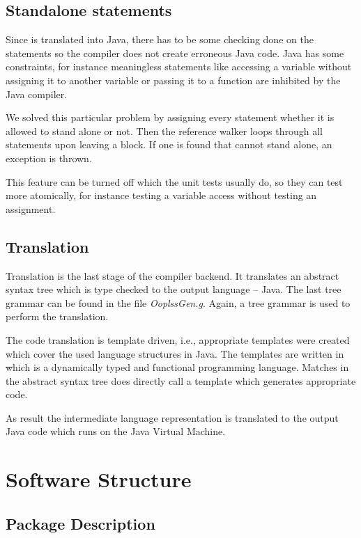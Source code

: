 \subsection{Standalone statements}
Since \ooplss is translated into Java, there has to be some checking
done on the statements so the compiler does not create erroneous Java
code. Java has some constraints, for instance meaningless statements
like accessing a variable without assigning it to another variable
or passing it to a function are inhibited by the Java compiler.

We solved this particular problem by assigning every statement whether
it is allowed to stand alone or not. Then the reference walker loops
through all statements upon leaving a block. If one is found that cannot
stand alone, an exception is thrown.

This feature can be turned off which the unit tests usually do, so
they can test more atomically, for instance testing a variable
access without testing an assignment.

\subsection{Translation}
Translation is the last stage of the compiler backend. It
translates an abstract syntax tree which is type checked to the
output language -- Java. The last tree grammar can be found in the
file \emph{OoplssGen.g}. Again, a tree grammar is used to perform the
translation.

The code translation is template driven, i.e., appropriate templates
were created which cover the used language structures in Java. The
templates are written in \st which is a dynamically typed and functional
programming language. Matches in the abstract syntax tree does directly
call a template which generates appropriate code.

As result the intermediate language representation is translated to the
output Java code which runs on the Java Virtual Machine.

\section{Software Structure}

\subsection{Package Description}

